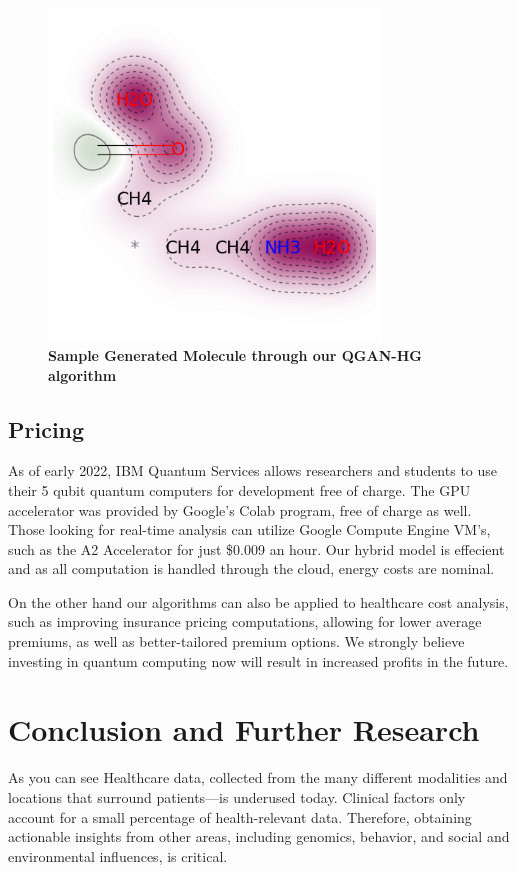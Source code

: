 \documentclass{scrartcl}
\begin{document}
\begin{figure}[htbp]
\centering
\includegraphics[width=250pt]{./assets/output4.png}
\caption{\textbf{Sample Generated Molecule through our QGAN-HG algorithm}}
\end{figure}

\subsection{Pricing}
\label{sec:orgf3f3cb9}

As of early 2022, IBM Quantum Services allows researchers and students to use their 5 qubit quantum computers for development free of charge. The GPU accelerator was provided by Google's Colab program, free of charge as well. Those looking for real-time analysis can utilize Google Compute Engine VM's, such as the A2 Accelerator for just \$0.009 an hour. Our hybrid model is effecient and as all computation is handled through the cloud, energy costs are nominal.

On the other hand our algorithms can also be applied to healthcare cost analysis, such as improving insurance pricing computations, allowing for lower average premiums, as well as better-tailored premium options. We strongly believe investing in quantum computing now will result in increased profits in the future.


\section{Conclusion and Further Research}
\label{sec:org41345ee}

As you can see Healthcare data, collected from the many different modalities and locations that surround patients—is underused today. Clinical factors only account for a small percentage of health-relevant data. Therefore, obtaining actionable insights from other areas, including genomics, behavior, and social and environmental influences, is critical.
\end{document}
